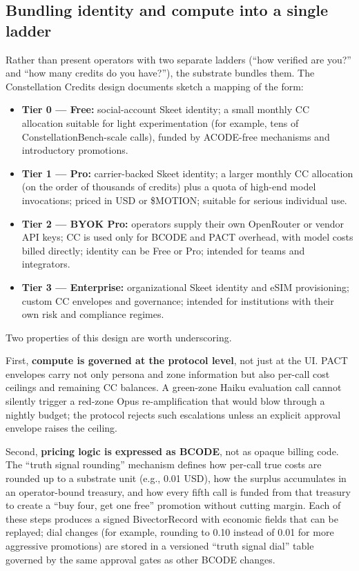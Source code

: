 \subsection{Bundling identity and compute into a single
ladder}\label{bundling-identity-and-compute-into-a-single-ladder}

Rather than present operators with two separate ladders (``how verified
are you?'' and ``how many credits do you have?''), the substrate bundles
them. The Constellation Credits design documents sketch a mapping of the
form:

\begin{itemize}
\tightlist
\item
  \textbf{Tier 0 --- Free:} social-account Skeet identity; a small
  monthly CC allocation suitable for light experimentation (for example,
  tens of ConstellationBench-scale calls), funded by ACODE-free
  mechanisms and introductory promotions.
\item
  \textbf{Tier 1 --- Pro:} carrier-backed Skeet identity; a larger
  monthly CC allocation (on the order of thousands of credits) plus a
  quota of high-end model invocations; priced in USD or \$MOTION;
  suitable for serious individual use.
\item
  \textbf{Tier 2 --- BYOK Pro:} operators supply their own OpenRouter or
  vendor API keys; CC is used only for BCODE and PACT overhead, with
  model costs billed directly; identity can be Free or Pro; intended for
  teams and integrators.
\item
  \textbf{Tier 3 --- Enterprise:} organizational Skeet identity and eSIM
  provisioning; custom CC envelopes and governance; intended for
  institutions with their own risk and compliance regimes.
\end{itemize}

Two properties of this design are worth underscoring.

First, \textbf{compute is governed at the protocol level}, not just at
the UI. PACT envelopes carry not only persona and zone information but
also per-call cost ceilings and remaining CC balances. A green-zone
Haiku evaluation call cannot silently trigger a red-zone Opus
re-amplification that would blow through a nightly budget; the protocol
rejects such escalations unless an explicit approval envelope raises the
ceiling.

Second, \textbf{pricing logic is expressed as BCODE}, not as opaque
billing code. The ``truth signal rounding'' mechanism defines how
per-call true costs are rounded up to a substrate unit (e.g., 0.01 USD),
how the surplus accumulates in an operator-bound treasury, and how every
fifth call is funded from that treasury to create a ``buy four, get one
free'' promotion without cutting margin. Each of these steps produces a
signed BivectorRecord with economic fields that can be replayed; dial
changes (for example, rounding to 0.10 instead of 0.01 for more
aggressive promotions) are stored in a versioned ``truth signal dial''
table governed by the same approval gates as other BCODE changes.

